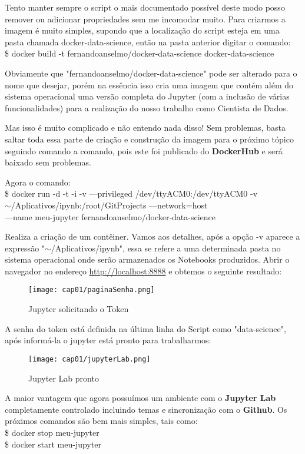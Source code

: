 Tento manter sempre o script o mais documentado possível deste modo posso remover ou adicionar propriedades sem me incomodar muito. Para criarmos a imagem é muito simples, supondo que a localização do script esteja em uma pasta chamada docker-data-science, então na pasta anterior digitar o comando: \\
{\ttfamily\$ docker build -t fernandoanselmo/docker-data-science docker-data-science}

Obviamente que "fernandoanselmo/docker-data-science" pode ser alterado para o nome que desejar, porém na essência isso cria uma imagem que contém além do sistema operacional uma versão completa do Jupyter (com a inclusão de várias funcionalidades) para a realização do nosso trabalho como Cientista de Dados. 

Mas isso é muito complicado e não entendo nada disso! Sem problemas, basta saltar toda essa parte de criação e construção da imagem para o próximo tópico seguindo comando a comando, pois este foi publicado do \textbf{DockerHub} e será baixado sem problemas.

Agora o comando: \\
{\ttfamily\$ docker run -d -t -i -v ---privileged /dev/ttyACM0:/dev/ttyACM0 -v \\ $\sim$/Aplicativos/ipynb:/root/GitProjects ---network=host \\
	 ---name meu-jupyter fernandoanselmo/docker-data-science}
 
Realiza a criação de um contêiner. Vamos aos detalhes, após a opção -v aparece a expressão "$\sim$/Aplicativos/ipynb", essa se refere a uma determinada pasta no sistema operacional onde serão armazenados os Notebooks produzidos. Abrir o navegador no endereço \url{http://localhost:8888} e obtemos o seguinte resultado:
\begin{figure}[H]
	\centering\texttt{[image: cap01/paginaSenha.png]}
	\caption{Jupyter solicitando o Token}
\end{figure}

A senha do token está definida na última linha do Script como "data-science", após informá-la o jupyter está pronto para trabalharmos:
\begin{figure}[H]
	\centering\texttt{[image: cap01/jupyterLab.png]}
	\caption{Jupyter Lab pronto}
\end{figure}

A maior vantagem que agora possuímos um ambiente com o \textbf{Jupyter Lab} completamente controlado incluindo temas e sincronização com o \textbf{Github}. Os próximos comandos são bem mais simples, tais como: \\
{\ttfamily\$ docker stop meu-jupyter} \\
{\ttfamily\$ docker start meu-jupyter}

